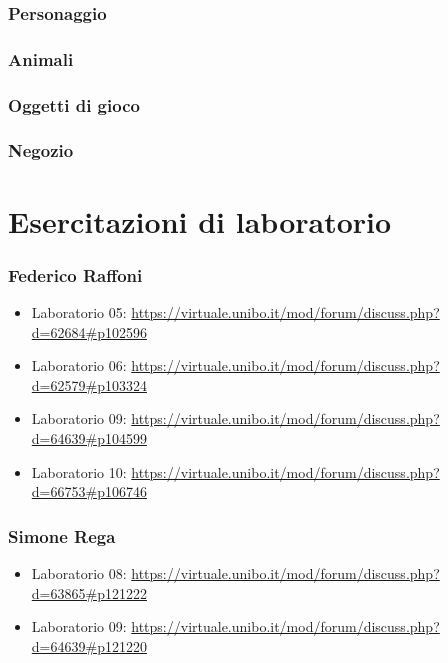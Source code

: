 \documentclass[a4paper,12pt]{report}
\begin{document}
\subsection{Personaggio}
	\label{personaggio}

\subsection{Animali}
	\label{animali}

\subsection{Oggetti di gioco}

\subsection{Negozio}

\chapter{Esercitazioni di laboratorio}

\subsection{Federico Raffoni}

\begin{itemize}
 \item Laboratorio 05: \url{https://virtuale.unibo.it/mod/forum/discuss.php?d=62684#p102596}
 \item Laboratorio 06: \url{https://virtuale.unibo.it/mod/forum/discuss.php?d=62579#p103324}
 \item Laboratorio 09: \url{https://virtuale.unibo.it/mod/forum/discuss.php?d=64639#p104599}
 \item Laboratorio 10: \url{https://virtuale.unibo.it/mod/forum/discuss.php?d=66753#p106746}
\end{itemize}

\subsection{Simone Rega}

\begin{itemize}
	\item Laboratorio 08: \url{https://virtuale.unibo.it/mod/forum/discuss.php?d=63865#p121222}
	\item Laboratorio 09: \url{https://virtuale.unibo.it/mod/forum/discuss.php?d=64639#p121220}
\end{itemize}
\end{document}
